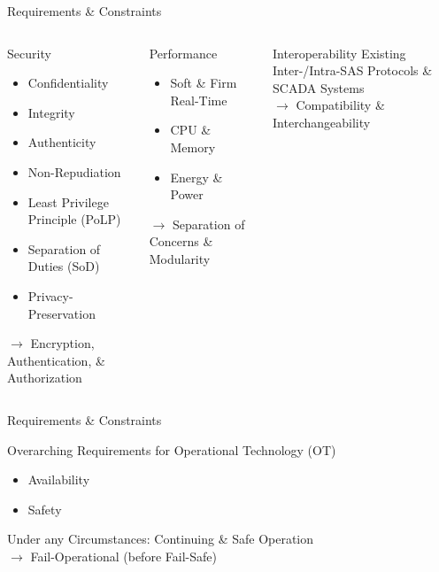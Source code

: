 \documentclass[en]{sdqbeamer}
\begin{document}
\begin{frame}{Requirements \& Constraints}
    \begin{columns}
        \begin{blueblock}{Security}
            \begin{itemize}
                \item Confidentiality
                \item Integrity
                \item Authenticity
                \item Non-Repudiation
                \item Least Privilege Principle (PoLP)
                \item Separation of Duties (SoD)
                \item Privacy-Preservation
            \end{itemize}
            $\rightarrow$ Encryption, Authentication, \& Authorization
        \end{blueblock}
        \begin{blueblock}{Performance}
            \begin{itemize}
                \item Soft \& Firm Real-Time
                \item CPU \& Memory
                \item Energy \& Power
            \end{itemize}
            $\rightarrow$ Separation of Concerns \& Modularity
        \end{blueblock}
        \begin{blueblock}{Interoperability}
             Existing Inter-/Intra-SAS Protocols \& SCADA Systems
             \\$\rightarrow$ Compatibility \& Interchangeability
        \end{blueblock}
    \end{columns}
\end{frame}
\begin{frame}{Requirements \& Constraints}
    \begin{redblock}{Overarching Requirements for Operational Technology (OT)}
        \begin{itemize}
            \item Availability
            \item Safety
        \end{itemize}
        Under any Circumstances: Continuing \& Safe Operation
        \\$\rightarrow$ Fail-Operational (before Fail-Safe)
    \end{redblock}
\end{frame}
\end{document}
